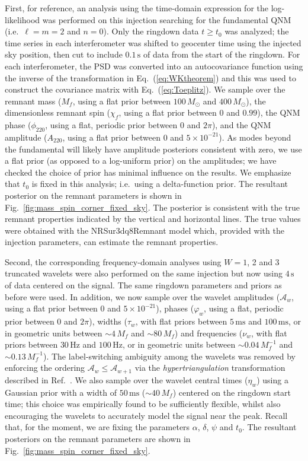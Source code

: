 First, for reference, an analysis using the time-domain expression for the log-likelihood was performed on this injection searching for the fundamental QNM (i.e.\ $\ell = m = 2$ and $n=0$).
Only the ringdown data $t\geq t_0$ was analyzed; the time series in each interferometer was shifted to geocenter time using the injected sky position, then cut to include $0.1\,\mathrm{s}$ of data from the start of the ringdown.
For each interferometer, the PSD was converted into an autocovariance function using the inverse of the transformation in Eq.~(\ref{eq:WKtheorem}) and this was used to construct the covariance matrix with Eq.~(\ref{eq:Toeplitz}).
We sample over the remnant mass ($M_f$, using a flat prior between $100\,M_\odot$ and $400\,M_\odot$), the dimensionless remnant spin ($\chi_f$, using a flat prior between $0$ and $0.99$), the QNM phase ($\phi_{220}$, using a flat, periodic prior between $0$ and $2\pi$), and the QNM amplitude ($A_{220}$, using a flat prior between 0 and $5 \times 10^{-21}$).
As modes beyond the fundamental will likely have amplitude posteriors consistent with zero, we use a flat prior (as opposed to a log-uniform prior) on the amplitudes; we have checked the choice of prior has minimal influence on the results.
We emphasize that $t_0$ is fixed in this analysis; i.e.\ using a delta-function prior.
The resultant posterior on the remnant parameters is shown in Fig.~\ref{fig:mass_spin_corner_fixed_sky}.
The posterior is consistent with the true remnant properties indicated by the vertical and horizontal lines. 
The true values were obtained with the NRSur3dq8Remnant model \cite{Varma:2018aht, Varma:2019csw, vijay_varma_2018_1435832} which, provided with the injection parameters, can estimate the remnant properties.

Second, the corresponding frequency-domain analyses using $W=1$, 2 and 3 truncated wavelets were also performed on the same injection but now using $4\,\mathrm{s}$ of data centered on the signal.
The same ringdown parameters and priors as before were used. 
In addition, we now sample over the wavelet amplitudes ($\mathcal{A}_w$, using a flat prior between 0 and $5 \times 10^{-21}$), phases ($\varphi_w$, using a flat, periodic prior between $0$ and $2\pi$), widths ($\tau_w$, with flat priors between $5\,\mathrm{ms}$ and $100\,\mathrm{ms}$, or in geometric units between $\sim 4\,M_f$ and $\sim 80\,M_f$) and frequencies ($\nu_w$, with flat priors between $30\,\mathrm{Hz}$ and $100\,\mathrm{Hz}$, or in geometric units between $\sim 0.04\,M_f^{-1}$ and $\sim 0.13\,M_f^{-1}$). 
The label-switching ambiguity among the wavelets was removed by enforcing the ordering $\mathcal{A}_w\leq\mathcal{A}_{w+1}$ via the \emph{hypertriangulation} transformation described in Ref.~\cite{Buscicchio:2019rir}.
We also sample over the wavelet central times ($\eta_w$) using a Gaussian prior with a width of $50\,\mathrm{ms}$ ($\sim 40\,M_f$) centered on the ringdown start time; this choice was empirically found to be sufficiently flexible, whilst also encouraging the wavelets to accurately model the signal near the peak.
Recall that, for the moment, we are fixing the parameters $\alpha$, $\delta$, $\psi$ and $t_0$.
The resultant posteriors on the remnant parameters are shown in Fig.~\ref{fig:mass_spin_corner_fixed_sky}.

